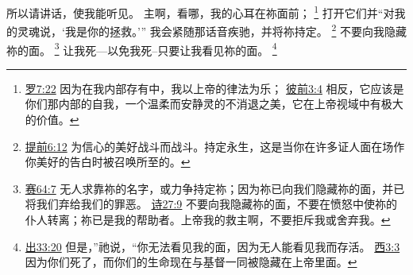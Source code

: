 \documentclass[12pt, a4paper, oneside]{ctexart}
\begin{document}
	所以请讲话，使我能听见。
    主啊，看哪，我的心耳在祢面前；
    \footnote {
        \href{https://biblehub.com/romans/7-22.htm}{罗7:22} 因为在我内部存有中，我以上帝的律法为乐；
        \href{https://biblehub.com/1_peter/3-4.htm}{彼前3:4} 相反，它应该是你们那内部的自我，一个温柔而安静灵的不消退之美，它在上帝视域中有极大的价值。
	}
    打开它们并“对我的灵魂说，‘我是你的拯救。’”
	我会紧随那话音疾驰，并将祢持定。
    \footnote {
        \href{https://biblehub.com/1_timothy/6-12.htm}{提前6:12} 为信心的美好战斗而战斗。持定永生，这是当你在许多证人面在场作你美好的告白时被召唤所至的。
	}
	不要向我隐藏祢的面。
    \footnote {
        \href{https://biblehub.com/isaiah/64-7.htm}{赛64:7} 无人求靠祢的名字，或力争持定祢；因为祢已向我们隐藏祢的面，并已将我们弃给我们的罪恶。
        \href{https://biblehub.com/psalms/27-9.htm}{诗27:9} 不要向我隐藏祢的面，不要在愤怒中使祢的仆人转离；祢已是我的帮助者。上帝我的救主啊，不要拒斥我或舍弃我。
	}
    让我死---以免我死--只要让我看见祢的面。
    \footnote {
        \href{https://biblehub.com/exodus/33-20.htm}{出33:20} 但是，”祂说，“你无法看见我的面，因为无人能看见我而存活。
        \href{https://biblehub.com/colossians/3-3.htm}{西3:3} 因为你们死了，而你们的生命现在与基督一同被隐藏在上帝里面。
	}
\end{document}
